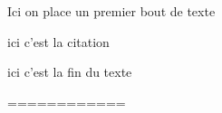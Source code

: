 \documentclass{sn-jnl}%
\begin{document}
Ici on place un premier bout de texte

		ici c'est la citation \cite{qu_vitro_2007}



ici c'est la fin du texte

============%


\end{document}
